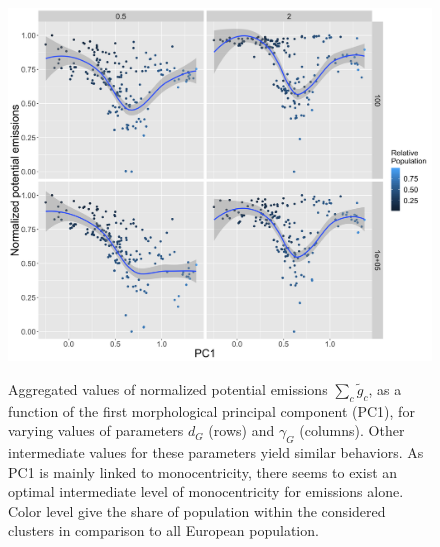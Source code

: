 \documentclass{jimis-en}
\begin{document}
\begin{figure}[!ht] 
  {\includegraphics[width=\linewidth]{Fig6.png}}
  \centering
  \caption{Aggregated values of normalized potential emissions $\sum_c \tilde{g}_c$, as a function of the first morphological principal component (PC1), for varying values of parameters $d_G$ (rows) and $\gamma_G$ (columns). Other intermediate values for these parameters yield similar behaviors. As PC1 is mainly linked to monocentricity, there seems to exist an optimal intermediate level of monocentricity for emissions alone. Color level give the share of population within the considered clusters in comparison to all European population.\label{fig:emissions-pc1}}
\end{figure}
\end{document}

